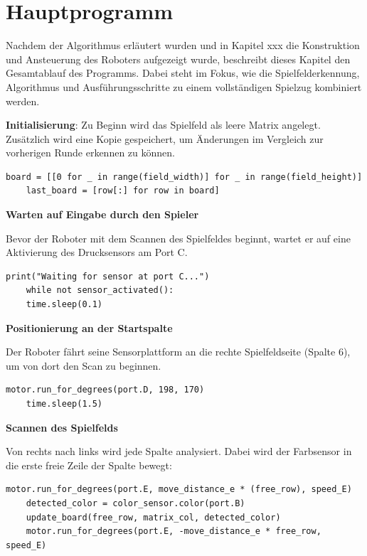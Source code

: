 \section{Hauptprogramm}

Nachdem der Algorithmus erläutert wurden und in Kapitel xxx die Konstruktion und Ansteuerung des Roboters aufgezeigt wurde, beschreibt dieses Kapitel den Gesamtablauf des Programms. Dabei steht im Fokus, wie die Spielfelderkennung, Algorithmus und Ausführungsschritte zu einem vollständigen Spielzug kombiniert werden.

\textbf{Initialisierung}:
Zu Beginn wird das Spielfeld als leere Matrix angelegt. Zusätzlich wird eine Kopie gespeichert, um Änderungen im Vergleich zur vorherigen Runde erkennen zu können.

\begin{lstlisting}[style=pythonstyle]
	board = [[0 for _ in range(field_width)] for _ in range(field_height)]
	last_board = [row[:] for row in board]
\end{lstlisting}

\textbf{Warten auf Eingabe durch den Spieler}

Bevor der Roboter mit dem Scannen des Spielfeldes beginnt, wartet er auf eine Aktivierung des Drucksensors am Port C.

\begin{lstlisting}[style=pythonstyle]
	print("Waiting for sensor at port C...")
	while not sensor_activated():
	time.sleep(0.1)
\end{lstlisting}

\textbf{Positionierung an der Startspalte}

Der Roboter fährt seine Sensorplattform an die rechte Spielfeldseite (Spalte 6), um von dort den Scan zu beginnen.

\begin{lstlisting}[style=pythonstyle]
	motor.run_for_degrees(port.D, 198, 170)
	time.sleep(1.5)
\end{lstlisting}

\textbf{Scannen des Spielfelds}

Von rechts nach links wird jede Spalte analysiert. Dabei wird der Farbsensor in die erste freie Zeile der Spalte bewegt:

\begin{lstlisting}[style=pythonstyle]
	motor.run_for_degrees(port.E, move_distance_e * (free_row), speed_E)
	detected_color = color_sensor.color(port.B)
	update_board(free_row, matrix_col, detected_color)
	motor.run_for_degrees(port.E, -move_distance_e * free_row, speed_E)
\end{lstlisting}

